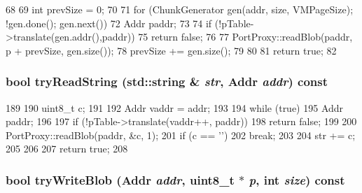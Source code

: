 \begin{DoxyCode}
68 {
69     int prevSize = 0;
70 
71     for (ChunkGenerator gen(addr, size, VMPageSize); !gen.done(); gen.next()) {
72         Addr paddr;
73 
74         if (!pTable->translate(gen.addr(),paddr))
75             return false;
76 
77         PortProxy::readBlob(paddr, p + prevSize, gen.size());
78         prevSize += gen.size();
79     }
80 
81     return true;
82 }
\end{DoxyCode}
\hypertarget{classSETranslatingPortProxy_a566bb321a4a4657816925b1421a8abfa}{
\subsubsection[{tryReadString}]{\setlength{\rightskip}{0pt plus 5cm}bool tryReadString (std::string \& {\em str}, \/  {\bf Addr} {\em addr}) const}}
\label{classSETranslatingPortProxy_a566bb321a4a4657816925b1421a8abfa}



\begin{DoxyCode}
189 {
190     uint8_t c;
191 
192     Addr vaddr = addr;
193 
194     while (true) {
195         Addr paddr;
196 
197         if (!pTable->translate(vaddr++, paddr))
198             return false;
199 
200         PortProxy::readBlob(paddr, &c, 1);
201         if (c == '\0')
202             break;
203 
204         str += c;
205     }
206 
207     return true;
208 }
\end{DoxyCode}
\hypertarget{classSETranslatingPortProxy_a0f56f41d9a37cca029fb3159d3561e5c}{
\subsubsection[{tryWriteBlob}]{\setlength{\rightskip}{0pt plus 5cm}bool tryWriteBlob ({\bf Addr} {\em addr}, \/  uint8\_\-t $\ast$ {\em p}, \/  int {\em size}) const}}
\label{classSETranslatingPortProxy_a0f56f41d9a37cca029fb3159d3561e5c}



